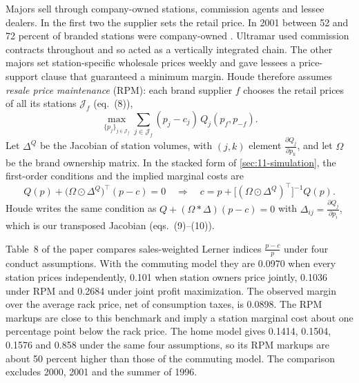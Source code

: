 Majors sell through company-owned stations, commission agents and lessee dealers. In the first two the supplier sets
the retail price. In 2001 between 52 and 72 percent of branded stations were company-owned \citep[p.~2168]{Houde2012}. Ultramar used commission contracts throughout and so acted as a vertically integrated chain. The
other majors set station-specific wholesale prices weekly and gave lessees a price-support clause that guaranteed a
minimum margin. Houde therefore assumes \emph{resale price maintenance} (RPM): each brand supplier $f$ chooses the
retail prices of all its stations $\mathcal{J}_f$ (eq.~(8)),
\begin{equation*}
\max_{\{p_j\}_{j \in \mathcal{J}_f}} \sum_{j \in \mathcal{J}_f}(p_j - c_j)\,Q_j(p_f, p_{-f}).
\end{equation*}
Let $\Delta^Q$ be the Jacobian of station volumes, with $(j,k)$ element $\frac{\partial Q_j}{\partial p_k}$, and let
$\Omega$ be the brand ownership matrix. In the stacked form of \cref{sec:11-simulation}, the first-order conditions and
the implied marginal costs are
\begin{equation}\label{eq:11-houde-foc}
Q(p) + \big(\Omega \odot \Delta^Q\big)^{\top}(p - c) = 0
\quad\Longrightarrow\quad
c = p + \big[(\Omega \odot \Delta^Q)^{\top}\big]^{-1} Q(p).
\end{equation}
Houde writes the same condition as $Q + (\Omega * \Delta)(p - c) = 0$ with $\Delta_{ij} = \frac{\partial Q_j}{\partial
p_i}$, which is our transposed Jacobian (eqs.~(9)--(10)).

Table~8 of the paper compares sales-weighted Lerner indices $\frac{p - c}{p}$ under four conduct assumptions. With
the commuting model they are 0.0970 when every station prices independently, 0.101 when station owners price jointly,
0.1036 under RPM and 0.2684 under joint profit maximization. The observed margin over the average rack price, net of
consumption taxes, is 0.0898. The RPM markups are close to this benchmark and imply a station marginal cost about one
percentage point below the rack price. The home model gives 0.1414, 0.1504, 0.1576 and 0.858 under the same four
assumptions, so its RPM markups are about 50 percent higher than those of the commuting model. The comparison
excludes 2000, 2001 and the summer of 1996.

